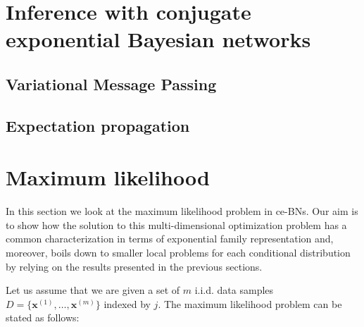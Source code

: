 \documentclass[11pt, oneside]{article}   	%
\newcommand{\bm}{\mathbf}
\numberwithin{figure}{section}
\numberwithin{equation}{section}
\numberwithin{table}{section}
\theoremstyle{definition}
\begin{document}
\section{Inference with conjugate exponential Bayesian networks}

\subsection{Variational Message Passing}

\subsection{Expectation propagation}


\section{Maximum likelihood}

In this section we look at the maximum likelihood problem in ce-BNs. Our aim is to show how the solution to this multi-dimensional optimization problem has a common characterization in terms of exponential family representation and, moreover, boils down to smaller local problems for each conditional distribution by relying on the results presented in the previous sections. 


Let us assume that we are given a set of $m$ i.i.d. data samples $D=\{\bm x^{(1)}, \ldots, \bm x^{(m)}\}$ indexed by $j$. The maximum likelihood problem can be stated as follows:
\end{document}
